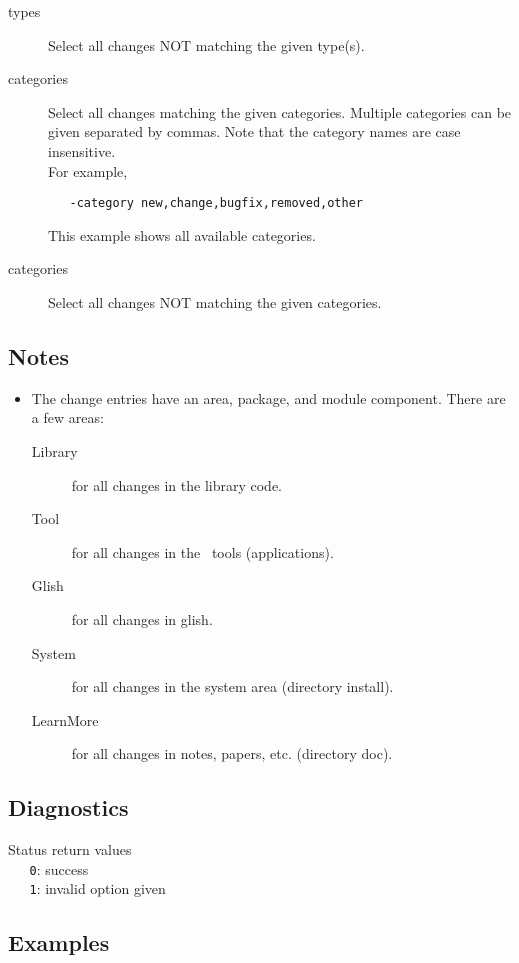 \begin{description}
\item[ types]
   Select all changes NOT matching the given type(s).

\item[ categories]
   Select all changes matching the given categories.
   Multiple categories can be given separated by commas.
   Note that the category names are case insensitive.
   \\For example,
\begin{verbatim}
   -category new,change,bugfix,removed,other
\end{verbatim}
   This example shows all available categories.

\item[ categories]
   Select all changes NOT matching the given categories.
\end{description}

\subsection*{Notes}

\begin{itemize}
\item
   The change entries have an area, package, and module component.
   There are a few areas:
   \begin{description}
     \item[Library]
       for all changes in the library code.
     \item[Tool]
       for all changes in the \aipspp\ tools (applications).
     \item[Glish]
       for all changes in glish.
     \item[System]
       for all changes in the system area (directory install).
     \item[LearnMore]
       for all changes in notes, papers, etc. (directory doc).
   \end{description}
\end{itemize}

\subsection*{Diagnostics}

Status return values
\\ \verb+   0+: success
\\ \verb+   1+: invalid option given

\subsection*{Examples}

